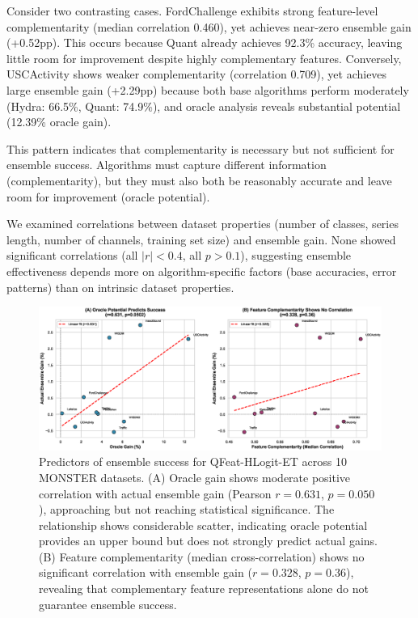 \documentclass[pdflatex,sn-basic]{sn-jnl}           %
\theoremstyle{thmstyleone}%
\theoremstyle{thmstyletwo}%
\theoremstyle{thmstylethree}%
\begin{document}
Consider two contrasting cases. FordChallenge exhibits strong feature-level complementarity (median correlation 0.460), yet achieves near-zero ensemble gain (+0.52pp). This occurs because Quant already achieves 92.3\% accuracy, leaving little room for improvement despite highly complementary features. Conversely, USCActivity shows weaker complementarity (correlation 0.709), yet achieves large ensemble gain (+2.29pp) because both base algorithms perform moderately (Hydra: 66.5\%, Quant: 74.9\%), and oracle analysis reveals substantial potential (12.39\% oracle gain).

This pattern indicates that complementarity is necessary but not sufficient for ensemble success. Algorithms must capture different information (complementarity), but they must also both be reasonably accurate and leave room for improvement (oracle potential).

We examined correlations between dataset properties (number of classes, series length, number of channels, training set size) and ensemble gain. None showed significant correlations (all $|r| < 0.4$, all $p > 0.1$), suggesting ensemble effectiveness depends more on algorithm-specific factors (base accuracies, error patterns) than on intrinsic dataset properties.

\begin{figure}[tb]
\centering
\includegraphics[width=\textwidth]{figure3_predictors}
\caption{Predictors of ensemble success for QFeat-HLogit-ET across 10 MONSTER datasets. (A) Oracle gain shows moderate positive correlation with actual ensemble gain (Pearson $r=0.631$, $p=0.050$), approaching but not reaching statistical significance. The relationship shows considerable scatter, indicating oracle potential provides an upper bound but does not strongly predict actual gains. (B) Feature complementarity (median cross-correlation) shows no significant correlation with ensemble gain ($r=0.328$, $p=0.36$), revealing that complementary feature representations alone do not guarantee ensemble success.}\label{fig:predictors}
\end{figure}
\end{document}
